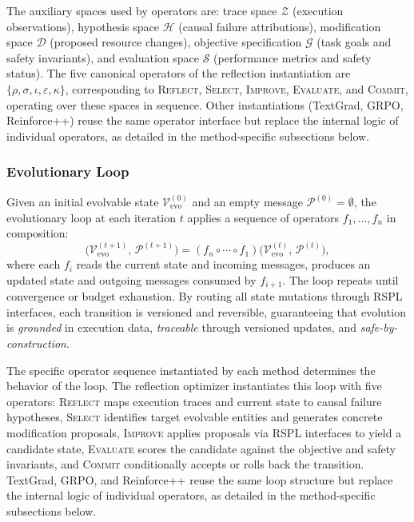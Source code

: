 The auxiliary spaces used by operators are: trace space $\mathcal{Z}$ (execution observations), hypothesis space $\mathcal{H}$ (causal failure attributions), modification space $\mathcal{D}$ (proposed resource changes), objective specification $\mathcal{G}$ (task goals and safety invariants), and evaluation space $\mathcal{S}$ (performance metrics and safety status). The five canonical operators of the reflection instantiation are $\{\rho, \sigma, \iota, \varepsilon, \kappa\}$, corresponding to \textsc{Reflect}, \textsc{Select}, \textsc{Improve}, \textsc{Evaluate}, and \textsc{Commit}, operating over these spaces in sequence. Other instantiations (TextGrad, GRPO, Reinforce++) reuse the same operator interface but replace the internal logic of individual operators, as detailed in the method-specific subsections below.

\subsubsection{Evolutionary Loop}

Given an initial evolvable state $\mathcal{V}_{\text{evo}}^{(0)}$ and an empty message $\mathcal{P}^{(0)} = \emptyset$, the evolutionary loop at each iteration $t$ applies a sequence of operators $f_1, \ldots, f_n$ in composition:
\begin{equation}
\bigl(\mathcal{V}_{\text{evo}}^{(t+1)},\, \mathcal{P}^{(t+1)}\bigr) = (f_n \circ \cdots \circ f_1)\bigl(\mathcal{V}_{\text{evo}}^{(t)},\, \mathcal{P}^{(t)}\bigr),
\end{equation}
where each $f_i$ reads the current state and incoming messages, produces an updated state and outgoing messages consumed by $f_{i+1}$. The loop repeats until convergence or budget exhaustion. By routing all state mutations through RSPL interfaces, each transition is versioned and reversible, guaranteeing that evolution is \emph{grounded} in execution data, \emph{traceable} through versioned updates, and \emph{safe-by-construction}.

The specific operator sequence instantiated by each method determines the behavior of the loop. The reflection optimizer instantiates this loop with five operators: \textsc{Reflect} maps execution traces and current state to causal failure hypotheses, \textsc{Select} identifies target evolvable entities and generates concrete modification proposals, \textsc{Improve} applies proposals via RSPL interfaces to yield a candidate state, \textsc{Evaluate} scores the candidate against the objective and safety invariants, and \textsc{Commit} conditionally accepts or rolls back the transition. TextGrad, GRPO, and Reinforce++ reuse the same loop structure but replace the internal logic of individual operators, as detailed in the method-specific subsections below.


